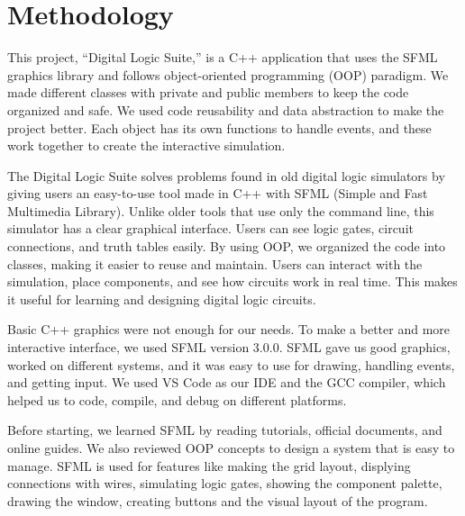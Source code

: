 \section{Methodology}

This project, “Digital Logic Suite,” is a C++ application that uses the SFML graphics library and follows object-oriented programming (OOP) paradigm. We made different classes with private and public members to keep the code organized and safe. We used code reusability and data abstraction to make the project better. Each object has its own functions to handle events, and these work together to create the interactive simulation.

\vspace{0.5cm}
The Digital Logic Suite solves problems found in old digital logic simulators by giving users an easy-to-use tool made in C++ with SFML (Simple and Fast Multimedia Library). Unlike older tools that use only the command line, this simulator has a clear graphical interface. Users can see logic gates, circuit connections, and truth tables easily. By using OOP, we organized the code into classes, making it easier to reuse and maintain. Users can interact with the simulation, place components, and see how circuits work in real time. This makes it useful for learning and designing digital logic circuits.

\vspace{0.5cm}
Basic C++ graphics were not enough for our needs. To make a better and more interactive interface, we used SFML version 3.0.0. SFML gave us good graphics, worked on different systems, and it was easy to use for drawing, handling events, and getting input. We used VS Code as our IDE and the GCC compiler, which helped us to code, compile, and debug on different platforms.

\vspace{0.5cm}
Before starting, we learned SFML by reading tutorials, official documents, and online guides. We also reviewed OOP concepts to design a system that is easy to manage. SFML is used for features like making the grid layout, displying connections with wires, simulating logic gates, showing the component palette, drawing the window, creating buttons and the visual layout of the program.
\clearpage